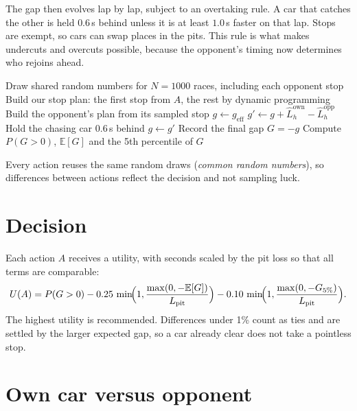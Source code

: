 \documentclass[11pt,a4paper]{article}
\newcommand{\E}{\mathbb{E}}
\begin{document}
The gap then evolves lap by lap, subject to an overtaking rule. A car that catches the
other is held $0.6$\,s behind unless it is at least $1.0$\,s faster on that lap. Stops are
exempt, so cars can swap places in the pits. This rule is what makes undercuts and
overcuts possible, because the opponent's timing now determines who rejoins ahead.

\begin{algorithm}[H]
\caption{Evaluating the candidate actions from lap $t$}
\begin{algorithmic}[1]
\small
\State Draw shared random numbers for $N=1000$ races, including each opponent stop
  \State Build our stop plan: the first stop from $A$, the rest by dynamic programming
    \State Build the opponent's plan from its sampled stop
    \State $g \gets g_{\text{eff}}$
      \State $g' \gets g + \hat{L}^{\text{own}}_h - \hat{L}^{\text{opp}}_h$
        \State Hold the chasing car $0.6$\,s behind
      \EndIf
      \State $g \gets g'$
    \EndFor
    \State Record the final gap $G = -g$
  \EndFor
  \State Compute $P(G>0)$, $\E[G]$ and the 5th percentile of $G$
\EndFor
\end{algorithmic}
\end{algorithm}

Every action reuses the same random draws (\emph{common random numbers}), so differences
between actions reflect the decision and not sampling luck.

\section{Decision}

Each action $A$ receives a utility, with seconds scaled by the pit loss so that all terms
are comparable:
\begin{equation}
U(A) = P(G>0)
 - 0.25\,\min\!\Bigl(1,\frac{\max(0,-\E[G])}{L_{\text{pit}}}\Bigr)
 - 0.10\,\min\!\Bigl(1,\frac{\max(0,-G_{5\%})}{L_{\text{pit}}}\Bigr).
\end{equation}
The highest utility is recommended. Differences under 1\% count as ties and are settled
by the larger expected gap, so a car already clear does not take a pointless stop.

\section{Own car versus opponent}
\end{document}
